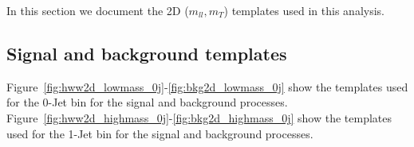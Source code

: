 In this section we document the 2D ($m_{ll}, m_T$) templates used in this analysis.  

\subsection{Signal and background templates}
Figure~\ref{fig:hww2d_lowmass_0j}-\ref{fig:bkg2d_lowmass_0j} show the 
templates used for the 0-Jet bin for the signal and background processes. 
Figure~\ref{fig:hww2d_highmass_0j}-\ref{fig:bkg2d_highmass_0j} show the 
templates used for the 1-Jet bin for the signal and background processes. 

\begin{figure}[!hbtp]
\centering
\\
\end{figure}
